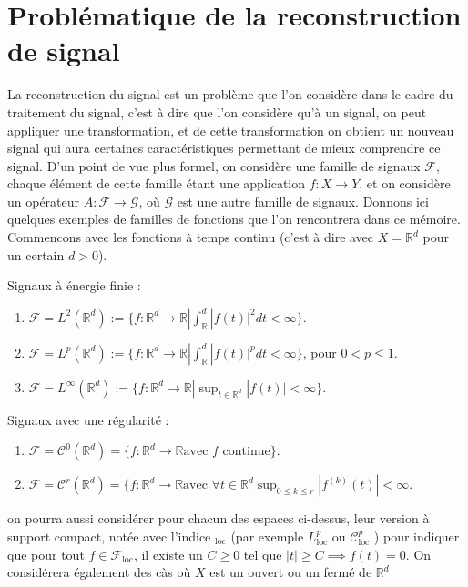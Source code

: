 \section{Problématique de la reconstruction de signal}
La reconstruction du signal est un problème que l'on considère dans le cadre du traitement du signal, c'est à dire que l'on considère qu'à un signal, on peut appliquer une transformation, et de cette transformation on obtient un nouveau signal qui aura certaines caractéristiques permettant de mieux comprendre ce signal.
D'un point de vue plus formel, on considère une famille de signaux $\mathcal{F}$, chaque élément de cette famille étant une application $f : X \longrightarrow Y$, et on considère un opérateur $A : \mathcal{F} \longrightarrow \mathcal{G}$, où $\mathcal{G}$ est une autre famille de signaux.
Donnons ici quelques exemples de familles de fonctions que l'on rencontrera dans ce mémoire. Commencons avec les fonctions à temps continu (c'est à dire avec $X = \mathbb{R}^d$ pour un certain $d>0$).
\begin{exemple}
	Signaux à énergie finie :
	\begin{enumerate}
		\item $\mathcal{F} = L^2(\mathbb{R}^d) := \{f : \mathbb{R}^d \longrightarrow \mathbb{R} | \int_\mathbb{R}^d |f(t)|^2dt < \infty\}$.
		\item $\mathcal{F} = L^p(\mathbb{R}^d) := \{f : \mathbb{R}^d \longrightarrow \mathbb{R} | \int_\mathbb{R}^d |f(t)|^pdt < \infty\}$, pour $0 < p \leq 1$.
		\item $\mathcal{F} = L^\infty(\mathbb{R}^d) := \{f : \mathbb{R}^d \longrightarrow \mathbb{R} | \sup_{t\in \mathbb{R}^d} |f(t)| < \infty\}$.
	\end{enumerate}
	Signaux avec une régularité :
	\begin{enumerate}
		\item $\mathcal{F} = \mathcal{C}^0(\mathbb{R}^d) =\{f : \mathbb{R}^d \longrightarrow \mathbb{R} \text{avec } f \text{ continue}\}$.
		\item $\mathcal{F} = \mathcal{C}^r(\mathbb{R}^d) =\{f : \mathbb{R}^d \longrightarrow \mathbb{R} \text{avec } \forall t \in \mathbb{R}^d \sup_{0\leq k \leq r} | f^{(k)}(t)| < \infty$.
	\end{enumerate}
\end{exemple}
on pourra aussi considérer pour chacun des espaces ci-dessus, leur version à support compact, notée avec l'indice $_\text{loc}$ (par exemple $L^p_\text{loc}$ ou $\mathcal{C}^p_\text{loc}$ ) pour indiquer que pour tout $f\in \mathcal{F}_\text{loc}$, il existe un $C \geq 0$ tel que $\lvert t \rvert \geq C \implies f(t) = 0$. On considérera également des càs où $X$ est un ouvert ou un fermé de $\mathbb{R}^d$

